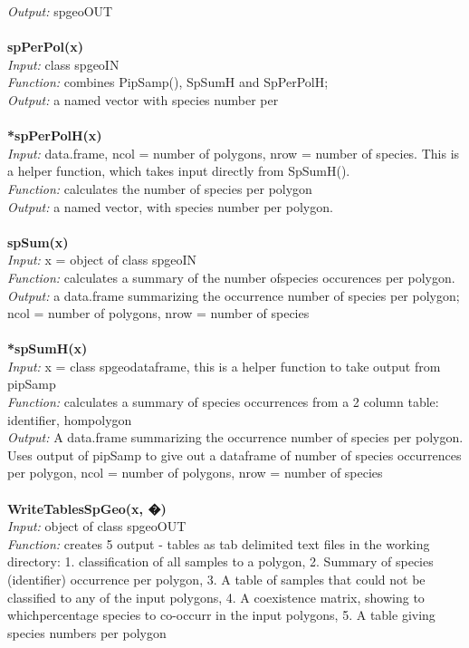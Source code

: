 \documentclass[a4paper,titlepage,11pt]{scrreprt}
\begin{document}
\textit{Output:} spgeoOUT\\
\\
\textbf{spPerPol(x)}\\
\textit{Input:} class spgeoIN\\
\textit{Function:} combines PipSamp(), SpSumH and SpPerPolH;\\
\textit{Output:} a named vector with species number per \\
\\
\textbf{*spPerPolH(x)}\\
\textit{Input:} data.frame, ncol = number of polygons, nrow = number of species. This is a helper function, which takes input directly from SpSumH().\\
\textit{Function:} calculates the number of species per polygon\\
\textit{Output:} a named vector, with species number per polygon.\\
\\
\textbf{spSum(x)}\\
\textit{Input:} x = object of class spgeoIN\\
\textit{Function:} calculates a summary of the number ofspecies occurences per polygon.\\
\textit{Output:} a data.frame summarizing the occurrence number of species per polygon; ncol = number of polygons, nrow = number of species\\
\\
\textbf{*spSumH(x)}\\
\textit{Input:} x = class spgeodataframe, this is a helper function to take output from pipSamp\\
\textit{Function:} calculates a summary of species occurrences from a 2 column table: identifier, hompolygon\\
\textit{Output:} A data.frame summarizing the occurrence number of species per polygon.\\
Uses output of pipSamp to give out a dataframe of number of species occurrences per polygon, ncol = number of polygons, nrow = number of species\\
\\
\textbf{WriteTablesSpGeo(x, �)}\\
\textit{Input:} object of class spgeoOUT\\
\textit{Function:} creates 5 output - tables as tab delimited text files in the working directory: 1. classification of all samples to a polygon, 2. Summary of species (identifier) occurrence per polygon, 3. A table of samples that could not be classified to any of the input polygons, 4. A coexistence matrix, showing to whichpercentage species to co-occurr in the input polygons, 5. A table giving species numbers per polygon\\
\end{document}
